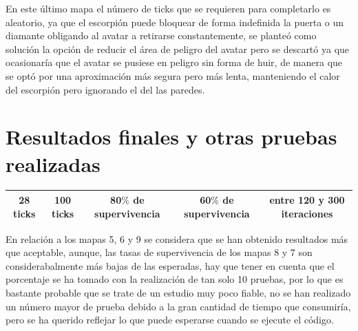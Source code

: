 En este último mapa el número de ticks que se requieren para completarlo es aleatorio, ya que el escorpión puede bloquear de forma indefinida la puerta o un diamante obligando al avatar a retirarse constantemente, se planteó como solución la opción de reducir el área de peligro del avatar pero se descartó ya que ocasionaría que el avatar se pusiese en peligro sin forma de huir, de manera que se optó por una aproximación más segura pero más lenta, manteniendo el calor del escorpión pero ignorando el del las paredes.

\section{Resultados finales y otras pruebas realizadas}

\begin{center}
\begin{tabular}{| c | c | c | c | c |}
 \hline
	28 ticks & 100 ticks & 80$\%$ de supervivencia & 60$\%$ de supervivencia & entre 120 y 300 iteraciones \\
 \hline
\end{tabular}
\end{center}
\indent En relación a los mapas  5, 6 y 9 se considera que se han obtenido resultados más que aceptable, aunque, las tasas de supervivencia de los mapas 8 y 7 son considerabalmente más bajas de las esperadas, hay que tener en cuenta que el porcentaje se ha tomado con la realización de tan solo 10 pruebas, por lo que es bastante probable que se trate de un estudio muy poco fiable, no se han realizado un número mayor de prueba debido a la gran cantidad de tiempo que consumiría, pero se ha querido reflejar lo que puede esperarse cuando se ejecute el código.
